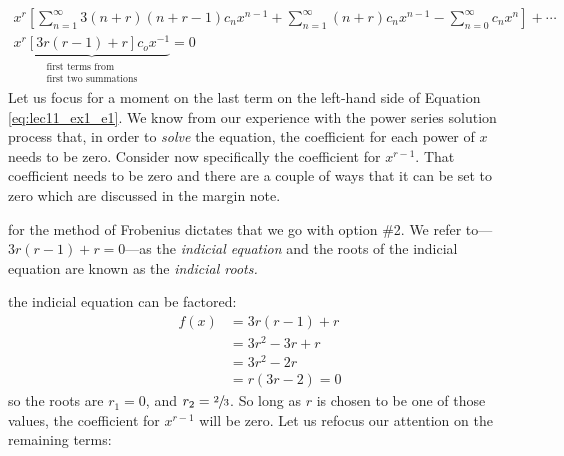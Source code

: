 \begin{multline}
x^r \left[\sum\limits_{n=1}^{\infty} 3(n+r)(n+r-1)c_nx^{n-1} + \sum\limits_{n=1}^{\infty} (n+r)c_nx^{n-1} - \sum\limits_{n=0}^{\infty}c_nx^n \right] + \cdots \\
\underbrace{x^r\left[3r(r-1) + r \right]c_ox^{-1}}_{\substack{\text{first terms from} \\ \text{first two summations}}} = 0
\label{eq:lec11_ex1_e1}
\end{multline}
Let us focus for a moment on the last term on the left-hand side of Equation \ref{eq:lec11_ex1_e1}.  We know from our experience with the power series solution process that, in order to \emph{solve} the equation, the coefficient for each power of $x$ needs to be zero.  Consider now specifically the coefficient for $x^{r-1}$.  That coefficient needs to be zero and there are a couple of ways that it can be set to zero which are discussed in the margin note.

 for the method of Frobenius dictates that we go with option \#2.  We refer to---$3r(r-1)+r = 0$---as the \emph{indicial equation} and the roots of the indicial equation are known as the \emph{indicial roots.} 

 the indicial equation can be factored:
\begin{align*}
f(x) &= 3r(r-1)+r \\
&=3r^2-3r+r \\
&=3r^2-2r \\
&=r(3r-2) = 0
\end{align*}
so the roots are $r_1=0$, and $r_2 = \sfrac{2}{3}$. So long as $r$ is chosen to be one of those values, the coefficient for $x^{r-1}$ will be zero.  Let us refocus our attention on the remaining terms:

